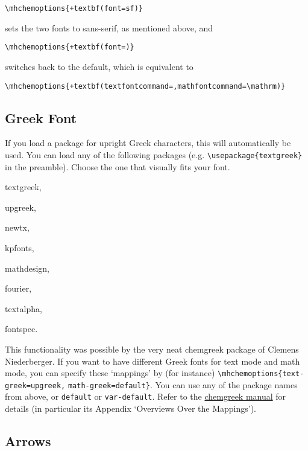 \documentclass[a4paper,notitlepage,parskip=half]{scrreprt}
\begin{document}
\begin{Verbatim}[commandchars=+()]
  \mhchemoptions{+textbf(font=sf)}
\end{Verbatim}

sets the two fonts to sans-serif, as mentioned above, and

\begin{Verbatim}[commandchars=+()]
  \mhchemoptions{+textbf(font=)}
\end{Verbatim}

switches back to the default, which is equivalent to

\begin{Verbatim}[commandchars=+()]
  \mhchemoptions{+textbf(textfontcommand=,mathfontcommand=\mathrm)}
\end{Verbatim}


\subsection{Greek Font} \label{sec:GreekFont}

If you load a package for upright Greek characters, this will automatically be used. You can load any of the following packages (e.g. \verb|\usepackage{textgreek}| in the preamble). Choose the one that visually fits your font.
\begin{compactitem}[--]
  \item textgreek,
  \item upgreek,
  \item newtx,
  \item kpfonts,
  \item mathdesign,
  \item fourier,
  \item textalpha,
  \item fontspec.
\end{compactitem}
This functionality was possible by the very neat chemgreek package of Clemens Niederberger. If you want to have different Greek fonts for text mode and math mode, you can specify these `mappings' by (for instance) \verb|\mhchemoptions{text-greek=upgreek,| \verb|math-greek=default}|. You can use any of the package names from above, or \verb|default| or \verb|var-default|. Refer to the	 \href{http://mirrors.ctan.org/macros/latex/contrib/chemgreek/chemgreek_en.pdf}{chemgreek manual} for details (in particular its Appendix `Overviews Over the Mappings').


\subsection{Arrows}
\end{document}
